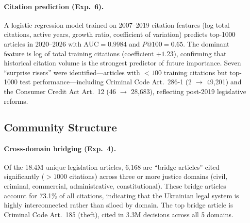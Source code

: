 \documentclass[11pt]{article}
\begin{document}
\paragraph{Citation prediction (Exp.~6).}
A logistic regression model trained on 2007--2019 citation features (log total citations, active years, growth ratio, coefficient of variation) predicts top-1000 articles in 2020--2026 with $\text{AUC} = 0.9984$ and $P@100 = 0.65$.
The dominant feature is log of total training citations (coefficient $+1.23$), confirming that historical citation volume is the strongest predictor of future importance.
Seven ``surprise risers'' were identified---articles with $<100$ training citations but top-1000 test performance---including Criminal Code Art.~286-1 (2 $\to$ 49,201) and the Consumer Credit Act Art.~12 (46 $\to$ 28,683), reflecting post-2019 legislative reforms.

\subsection{Community Structure}
\label{sec:community-results}

\paragraph{Cross-domain bridging (Exp.~4).}
Of the 18.4M unique legislation articles, 6,168 are ``bridge articles'' cited significantly ($>1000$ citations) across three or more justice domains (civil, criminal, commercial, administrative, constitutional).
These bridge articles account for 73.1\% of all citations, indicating that the Ukrainian legal system is highly interconnected rather than siloed by domain.
The top bridge article is Criminal Code Art.~185 (theft), cited in 3.3M decisions across all 5 domains.
\end{document}
